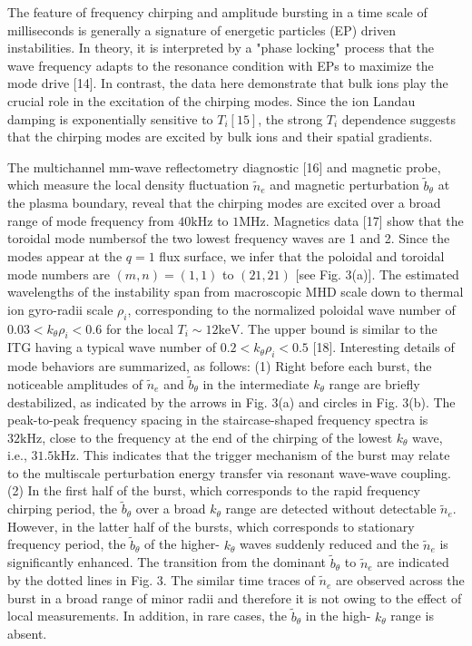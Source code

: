 \documentclass[oneside,onecolumn]{article}
\begin{document}
\begin{sloppypar}
 
 The feature of frequency chirping and amplitude bursting in a time scale of milliseconds is generally a signature of energetic particles (EP) driven instabilities. In theory, it is interpreted by a "phase locking" process that the wave frequency adapts to the resonance condition with EPs to maximize the mode drive [14]. In contrast, the data here demonstrate that bulk ions play the crucial role in the excitation of the chirping modes. Since the ion Landau damping is exponentially sensitive to $T_{i}[15]$, the strong $T_{i}$ dependence suggests that the chirping modes are excited by bulk ions and their spatial gradients.
 
 The multichannel mm-wave reflectometry diagnostic [16] and magnetic probe, which measure the local density fluctuation $\tilde{n}_{e}$ and magnetic perturbation $\tilde{b}_{\theta}$ at the plasma boundary, reveal that the chirping modes are excited over a broad range of mode frequency from $40 \mathrm{kHz}$ to $1 \mathrm{MHz}$. Magnetics data [17] show that the toroidal mode numbersof the two lowest frequency waves are 1 and 2. Since the modes appear at the $q=1$ flux surface, we infer that the poloidal and toroidal mode numbers are $(m, n)=(1,1)$ to $(21,21)$ [see Fig. 3(a)]. The estimated wavelengths of the instability span from macroscopic MHD scale down to thermal ion gyro-radii scale $\rho_{i}$, corresponding to the normalized poloidal wave number of $0.03<k_{\theta} \rho_{i}<0.6$ for the local $T_{i} \sim 12 \mathrm{keV}$. The upper bound is similar to the ITG having a typical wave number of $0.2<k_{\theta} \rho_{i}<0.5$ [18]. Interesting details of mode behaviors are summarized, as follows: (1) Right before each burst, the noticeable amplitudes of $\tilde{n}_{e}$ and $\tilde{b}_{\theta}$ in the intermediate $k_{\theta}$ range are briefly destabilized, as indicated by the arrows in Fig. 3(a) and circles in Fig. 3(b). The peak-to-peak frequency spacing in the staircase-shaped frequency spectra is $32 \mathrm{kHz}$, close to the frequency at the end of the chirping of the lowest $k_{\theta}$ wave, i.e., $31.5 \mathrm{kHz}$. This indicates that the trigger mechanism of the burst may relate to the multiscale perturbation energy transfer via resonant wave-wave coupling. (2) In the first half of the burst, which corresponds to the rapid frequency chirping period, the $\tilde{b}_{\theta}$ over a broad $k_{\theta}$ range are detected without detectable $\tilde{n}_{e}$. However, in the latter half of the bursts, which corresponds to stationary frequency period, the $\tilde{b}_{\theta}$ of the higher- $k_{\theta}$ waves suddenly reduced and the $\tilde{n}_{e}$ is significantly enhanced. The transition from the dominant $\tilde{b}_{\theta}$ to $\tilde{n}_{e}$ are indicated by the dotted lines in Fig. 3. The similar time traces of $\tilde{n}_{e}$ are observed across the burst in a broad range of minor radii and therefore it is not owing to the effect of local measurements. In addition, in rare cases, the $\tilde{b}_{\theta}$ in the high- $k_{\theta}$ range is absent.

\end{sloppypar}
\end{document}
